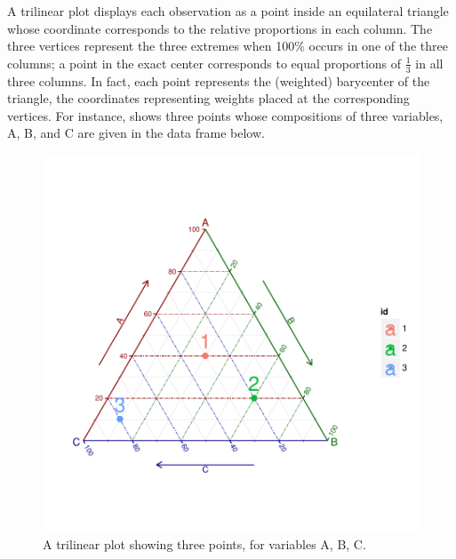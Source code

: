 \documentclass[10pt,krantz2]{krantz}\usepackage[]{graphicx}\usepackage[]{color}
\newenvironment{knitrout}{}{} %
\renewenvironment{knitrout}{\small\renewcommand{\baselinestretch}{.85}}{} %
\begin{document}
A trilinear plot displays each observation as a point inside
an equilateral triangle whose coordinate corresponds to the
relative proportions in each column.
The three vertices represent the three extremes when 100\%
occurs in one of the three columns; a point in the exact
center corresponds to equal proportions of $\frac13$ in
all three columns.  In fact, each point represents the (weighted)
barycenter of the triangle, the coordinates representing weights
placed at the corresponding vertices. For instance, 
shows three points whose compositions of three variables,
A, B, and C are given in the data frame  below.
\begin{knitrout}
\color{fgcolor}\begin{figure}[!htbp]

\centerline{\includegraphics[width=.6\textwidth,trim=20 20 20 20,clip]{ch04/fig/tripdemo2-1} }

\caption[A trilinear plot showing three points, for variables A, B, C]{A trilinear plot showing three points, for variables A, B, C.\label{fig:tripdemo2}}
\end{figure}


\end{knitrout}
\end{document}
